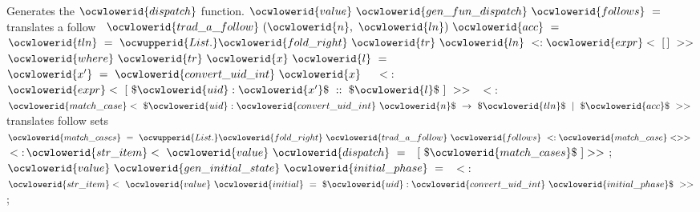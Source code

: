 \documentclass[12pt]{article}
\begin{document}
\ocwendcode{}\ocwindent{0.00em}
Generates the \ocwbegindcode{}$\ocwlowerid{dispatch}$\ocwenddcode{} function. 
\ocweol
\label{../ML/regular.ml:22340}%
\medskip
\ocwbegincode{}\ocwindent{0.00em}
$\ocwlowerid{value}~\ocwlowerid{gen\_fun\_dispatch}~\ocwlowerid{follows}~=~$\ocweol
\ocwindent{1.00em}
\ocwbc{} translates a follow \ocwec{}\ocweol
\ocwindent{1.00em}
~$\ocwlowerid{trad\_a\_follow}~(\ocwlowerid{n},~\ocwlowerid{ln})~\ocwlowerid{acc}~=~$\ocweol
\ocwindent{2.00em}
~$\ocwlowerid{tln}~=~\ocwupperid{List.}\ocwlowerid{fold\_right}~\ocwlowerid{tr}~\ocwlowerid{ln}~\ensuremath{<}:\ocwlowerid{expr}<~[\,]~\ensuremath{>}\ensuremath{>}$\ocweol
\ocwindent{4.00em}
$\ocwlowerid{where}~\ocwlowerid{tr}~\ocwlowerid{x}~\ocwlowerid{l}~=~$\ocweol
\ocwindent{5.50em}
~$\ocwlowerid{x'}~=~\ocwlowerid{convert\_uid\_int}~\ocwlowerid{x}~$~\ocweol
\ocwindent{5.50em}
\ensuremath{<}:$\ocwlowerid{expr}<~[~\$\ocwlowerid{uid}:\ocwlowerid{x'}\$~::~\$\ocwlowerid{l}\$~]~\ensuremath{>}\ensuremath{>}~$\ocweol
\ocwindent{2.00em}
\ensuremath{<}:$\ocwlowerid{match\_case}<~\$\ocwlowerid{uid}:\ocwlowerid{convert\_uid\_int}~\ocwlowerid{n}\$~\rightarrow{}~\$\ocwlowerid{tln}\$~\mid{}~\$\ocwlowerid{acc}\$~\ensuremath{>}\ensuremath{>}~$\ocweol
\ocwindent{1.00em}
\ocwbc{} translates follow sets \ocwec{}\ocweol
\ocwindent{1.00em}
~$\ocwlowerid{match\_cases}~=~\ocwupperid{List.}\ocwlowerid{fold\_right}~\ocwlowerid{trad\_a\_follow}~\ocwlowerid{follows}~\ensuremath{<}:\ocwlowerid{match\_case}\ensuremath{<}\ensuremath{>}\ensuremath{>}~$\ocweol
\ocwindent{1.00em}
\ensuremath{<}:$\ocwlowerid{str\_item}<~\ocwlowerid{value}~\ocwlowerid{dispatch}~=~$~$[~\$\ocwlowerid{match\_cases}\$~]\ensuremath{>}\ensuremath{>}$\ocweol
\ocwindent{0.00em}
;\ocweol
\ocwindent{0.00em}
$\ocwlowerid{value}~\ocwlowerid{gen\_initial\_state}~\ocwlowerid{initial\_phase}~=~$\ocweol
\ocwindent{1.00em}
\ensuremath{<}:$\ocwlowerid{str\_item}<~\ocwlowerid{value}~\ocwlowerid{initial}~=~\$\ocwlowerid{uid}:\ocwlowerid{convert\_uid\_int}~\ocwlowerid{initial\_phase}\$~\ensuremath{>}\ensuremath{>}$\ocweol
\ocwindent{0.00em}
;\medskip
\end{document}
